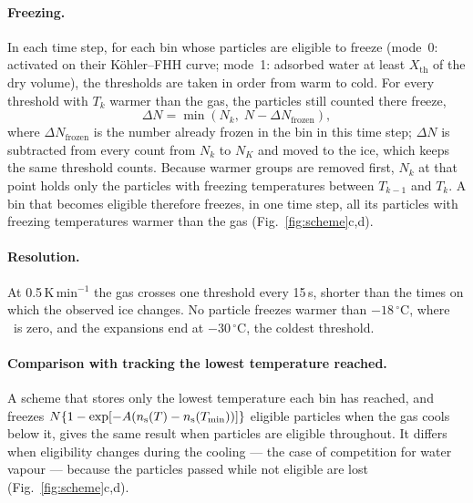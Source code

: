 \paragraph{Freezing.} In each time step, for each bin whose particles are eligible to freeze (mode~0: activated on their K\"ohler--FHH curve; mode~1: adsorbed water at least $X_\mathrm{th}$ of the dry volume), the thresholds are taken in order from warm to cold. For every threshold with $T_k$ warmer than the gas, the particles still counted there freeze,
\begin{equation}
  \Delta N = \min\left(N_k,\; N - \Delta N_\mathrm{frozen}\right),
  \label{eq:appA2}
\end{equation}
where $\Delta N_\mathrm{frozen}$ is the number already frozen in the bin in this time step; $\Delta N$ is subtracted from every count from $N_k$ to $N_K$ and moved to the ice, which keeps the same threshold counts. Because warmer groups are removed first, $N_k$ at that point holds only the particles with freezing temperatures between $T_{k-1}$ and $T_k$. A bin that becomes eligible therefore freezes, in one time step, all its particles with freezing temperatures warmer than the gas (Fig.~\ref{fig:scheme}c,d).

\paragraph{Resolution.} At 0.5\,K\,min$^{-1}$ the gas crosses one threshold every 15\,s, shorter than the times on which the observed ice changes. No particle freezes warmer than $-18\,^\circ$C, where \ns\ is zero, and the expansions end at $-30\,^\circ$C, the coldest threshold.

\paragraph{Comparison with tracking the lowest temperature reached.} A scheme that stores only the lowest temperature each bin has reached, and freezes $N\{1-\exp[-A(n_\mathrm{s}(T)-n_\mathrm{s}(T_\mathrm{min}))]\}$ eligible particles when the gas cools below it, gives the same result when particles are eligible throughout. It differs when eligibility changes during the cooling --- the case of competition for water vapour --- because the particles passed while not eligible are lost (Fig.~\ref{fig:scheme}c,d). 


